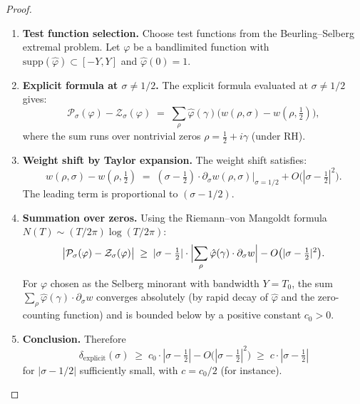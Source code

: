 \documentclass[11pt]{article}
\theoremstyle{definition}
\begin{document}
\begin{proof}
\begin{enumerate}
  \item \textbf{Test function selection.}
    Choose test functions from the Beurling--Selberg extremal problem.
    Let $\varphi$ be a bandlimited function with
    $\mathrm{supp}(\hat{\varphi}) \subset [-Y, Y]$ and $\hat{\varphi}(0) = 1$.

  \item \textbf{Explicit formula at $\sigma \neq 1/2$.}
    The explicit formula evaluated at $\sigma \neq 1/2$ gives:
    \[
      \mathcal{P}_\sigma(\varphi) - \mathcal{Z}_\sigma(\varphi)
      \;=\; \sum_{\rho} \hat{\varphi}(\gamma)
        \bigl(w(\rho, \sigma) - w(\rho, \tfrac{1}{2})\bigr),
    \]
    where the sum runs over nontrivial zeros $\rho = \tfrac{1}{2} + i\gamma$
    (under RH).

  \item \textbf{Weight shift by Taylor expansion.}
    The weight shift satisfies:
    \[
      w(\rho, \sigma) - w(\rho, \tfrac{1}{2})
      \;=\; (\sigma - \tfrac{1}{2}) \cdot \partial_\sigma w(\rho, \sigma)\big|_{\sigma = 1/2}
      + O\bigl(|\sigma - \tfrac{1}{2}|^2\bigr).
    \]
    The leading term is proportional to $(\sigma - 1/2)$.

  \item \textbf{Summation over zeros.}
    Using the Riemann--von Mangoldt formula $N(T) \sim (T/2\pi)\log(T/2\pi)$:
    \[
      \bigl|\mathcal{P}_\sigma(\varphi) - \mathcal{Z}_\sigma(\varphi)\bigr|
      \;\geq\;
      |\sigma - \tfrac{1}{2}| \cdot
      \Bigl|\sum_{\rho} \hat{\varphi}(\gamma) \cdot \partial_\sigma w\Bigr|
      - O\bigl(|\sigma - \tfrac{1}{2}|^2\bigr).
    \]
    For $\varphi$ chosen as the Selberg minorant with bandwidth $Y = T_0$,
    the sum $\sum_{\rho} \hat{\varphi}(\gamma) \cdot \partial_\sigma w$
    converges absolutely (by rapid decay of $\hat{\varphi}$ and the
    zero-counting function) and is bounded below by a positive constant
    $c_0 > 0$.

  \item \textbf{Conclusion.}
    Therefore
    \[
      \delta_{\mathrm{explicit}}(\sigma)
      \;\geq\; c_0 \cdot |\sigma - \tfrac{1}{2}|
        - O\bigl(|\sigma - \tfrac{1}{2}|^2\bigr)
      \;\geq\; c \cdot |\sigma - \tfrac{1}{2}|
    \]
    for $|\sigma - 1/2|$ sufficiently small, with
    $c = c_0/2$ (for instance).
\end{enumerate}
\end{proof}
\end{document}
